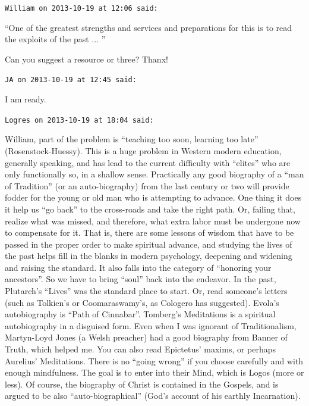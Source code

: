 \begin{footnotesize}
\begin{sffamily}
\texttt{William on 2013-10-19 at 12:06 said:}

``One of the greatest strengths and services and preparations for this is to read the exploits of the past ... ''

Can you suggest a resource or three? Thanx!

\hfill

\texttt{JA on 2013-10-19 at 12:45 said:}

I am ready.

\hfill

\texttt{Logres on 2013-10-19 at 18:04 said:}

William, part of the problem is ``teaching too soon, learning too late'' (Rosenstock-Huessy). This is a huge problem in Western modern education, generally speaking, and has lead to the current difficulty with ``elites'' who are only functionally so, in a shallow sense. Practically any good biography of a ``man of Tradition'' (or an auto-biography) from the last century or two will provide fodder for the young or old man who is attempting to advance. One thing it does it help us ``go back'' to the cross-roads and take the right path. Or, failing that, realize what was missed, and therefore, what extra labor must be undergone now to compensate for it. That is, there are some lessons of wisdom that have to be passed in the proper order to make spiritual advance, and studying the lives of the past helps fill in the blanks in modern psychology, deepening and widening and raising the standard. It also falls into the category of ``honoring your ancestors''. So we have to bring ``soul'' back into the endeavor. In the past, Plutarch's ``Lives'' was the standard place to start. Or, read someone's letters (such as Tolkien's or Coomaraswamy's, as Cologero has suggested). Evola's autobiography is ``Path of Cinnabar''. Tomberg's Meditations is a spiritual autobiography in a disguised form. Even when I was ignorant of Traditionalism, Martyn-Loyd Jones (a Welsh preacher) had a good biography from Banner of Truth, which helped me. You can also read Epictetus' maxims, or perhaps Aurelius' Meditations. There is no ``going wrong'' if you choose carefully and with enough mindfulness. The goal is to enter into their Mind, which is Logos (more or less). Of course, the biography of Christ is contained in the Gospels, and is argued to be also ``auto-biographical'' (God's account of his earthly Incarnation).


\end{sffamily}
\end{footnotesize}
